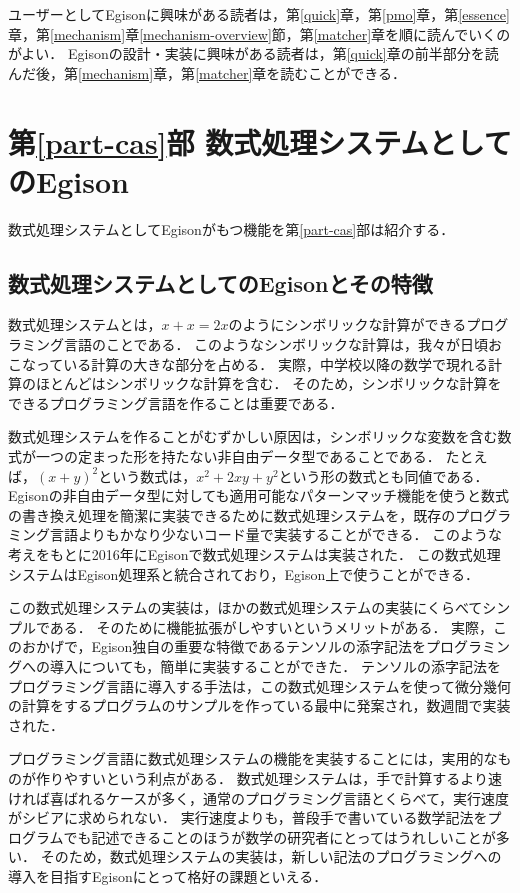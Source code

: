 ユーザーとしてEgisonに興味がある読者は，第\ref{quick}章，第\ref{pmo}章，第\ref{essence}章，第\ref{mechanism}章\ref{mechanism-overview}節，第\ref{matcher}章を順に読んでいくのがよい．
Egisonの設計・実装に興味がある読者は，第\ref{quick}章の前半部分を読んだ後，第\ref{mechanism}章，第\ref{matcher}章を読むことができる．

\section{第\ref{part-cas}部 数式処理システムとしてのEgison}\label{intro-cas}

数式処理システムとしてEgisonがもつ機能を第\ref{part-cas}部は紹介する．

\subsection{数式処理システムとしてのEgisonとその特徴}

数式処理システムとは，$x + x = 2 x$のようにシンボリックな計算ができるプログラミング言語のことである．
このようなシンボリックな計算は，我々が日頃おこなっている計算の大きな部分を占める．
実際，中学校以降の数学で現れる計算のほとんどはシンボリックな計算を含む．
そのため，シンボリックな計算をできるプログラミング言語を作ることは重要である．

数式処理システムを作ることがむずかしい原因は，シンボリックな変数を含む数式が一つの定まった形を持たない非自由データ型であることである．
たとえば，$(x + y)^2$という数式は，$x^2 + 2 x y + y^2$という形の数式とも同値である．
Egisonの非自由データ型に対しても適用可能なパターンマッチ機能を使うと数式の書き換え処理を簡潔に実装できるために数式処理システムを，既存のプログラミング言語よりもかなり少ないコード量で実装することができる．
このような考えをもとに2016年にEgisonで数式処理システムは実装された．
この数式処理システムはEgison処理系と統合されており，Egison上で使うことができる．

この数式処理システムの実装は，ほかの数式処理システムの実装にくらべてシンプルである．
そのために機能拡張がしやすいというメリットがある．
実際，このおかげで，Egison独自の重要な特徴であるテンソルの添字記法をプログラミングへの導入についても，簡単に実装することができた．
テンソルの添字記法をプログラミング言語に導入する手法は，この数式処理システムを使って微分幾何の計算をするプログラムのサンプルを作っている最中に発案され，数週間で実装された．

プログラミング言語に数式処理システムの機能を実装することには，実用的なものが作りやすいという利点がある．
数式処理システムは，手で計算するより速ければ喜ばれるケースが多く，通常のプログラミング言語とくらべて，実行速度がシビアに求められない．
実行速度よりも，普段手で書いている数学記法をプログラムでも記述できることのほうが数学の研究者にとってはうれしいことが多い．
そのため，数式処理システムの実装は，新しい記法のプログラミングへの導入を目指すEgisonにとって格好の課題といえる．

